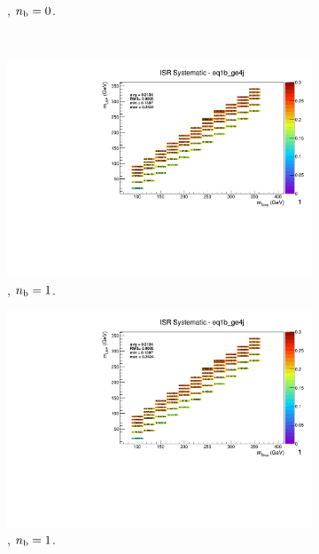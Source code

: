 \begin{figure}[ht!]
\begin{subfigure}[b]{0.32\textwidth}
    \caption{\njhigh, $n_{\text{b}} = 0$.}
  \end{subfigure}\\
  \begin{subfigure}[b]{0.32\textwidth}
    \includegraphics[width=\textwidth, page=12]{Figs/sms/t2cc/v37/systs/T2cc_ISR_eq1b_ge4j.pdf}
    \caption{\njhigh, $n_{\text{b}} = 1$.}
  \end{subfigure}
  \begin{subfigure}[b]{0.32\textwidth}
    \includegraphics[width=\textwidth, page=8]{Figs/sms/t2cc/v37/systs/T2cc_ISR_eq1b_ge4j.pdf}
    \caption{\njhigh, $n_{\text{b}} = 1$.}
  \end{subfigure}
  \begin{subfigure}[b]{0.32\textwidth}

\end{subfigure}
\end{figure}
